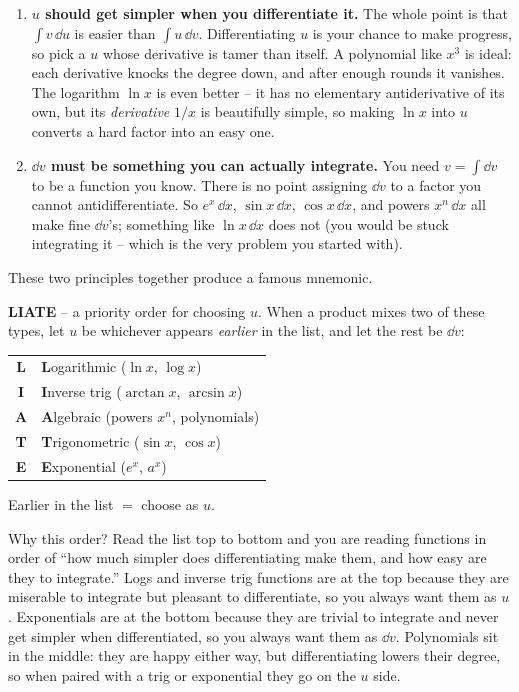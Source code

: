 \begin{enumerate}
\item \textbf{$u$ should get simpler when you differentiate it.} The whole point
is that $\int v\,\dd u$ is easier than $\int u\,\dd v$. Differentiating $u$ is
your chance to make progress, so pick a $u$ whose derivative is tamer than
itself. A polynomial like $x^3$ is ideal: each derivative knocks the degree down,
and after enough rounds it vanishes. The logarithm $\ln x$ is even better -- it
has no elementary antiderivative of its own, but its \emph{derivative} $1/x$ is
beautifully simple, so making $\ln x$ into $u$ converts a hard factor into an
easy one.

\item \textbf{$\dd v$ must be something you can actually integrate.} You need
$v=\int \dd v$ to be a function you know. There is no point assigning $\dd v$ to a
factor you cannot antidifferentiate. So $e^x\,\dd x$, $\sin x\,\dd x$,
$\cos x\,\dd x$, and powers $x^n\,\dd x$ all make fine $\dd v$'s; something like
$\ln x\,\dd x$ does not (you would be stuck integrating it -- which is the very
problem you started with).
\end{enumerate}

These two principles together produce a famous mnemonic.

\begin{focusbox}
\textbf{LIATE} -- a priority order for choosing $u$. When a product mixes two of
these types, let $u$ be whichever appears \emph{earlier} in the list, and let the
rest be $\dd v$:
\begin{center}
\begin{tabular}{cl}
\textbf{L} & \textbf{L}ogarithmic ($\ln x$, $\log x$) \\
\textbf{I} & \textbf{I}nverse trig ($\arctan x$, $\arcsin x$) \\
\textbf{A} & \textbf{A}lgebraic (powers $x^n$, polynomials) \\
\textbf{T} & \textbf{T}rigonometric ($\sin x$, $\cos x$) \\
\textbf{E} & \textbf{E}xponential ($e^x$, $a^x$) \\
\end{tabular}
\end{center}
Earlier in the list $=$ choose as $u$.
\end{focusbox}

Why this order? Read the list top to bottom and you are reading functions in
order of ``how much simpler does differentiating make them, and how easy are they
to integrate.'' Logs and inverse trig functions are at the top because they are
miserable to integrate but pleasant to differentiate, so you always want them as
$u$. Exponentials are at the bottom because they are trivial to integrate and
never get simpler when differentiated, so you always want them as $\dd v$.
Polynomials sit in the middle: they are happy either way, but differentiating
lowers their degree, so when paired with a trig or exponential they go on the $u$
side.


